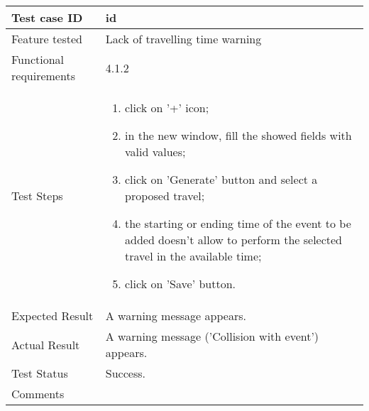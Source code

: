 \begin{table}[H]
	\begin{center}
		\begin{tabular}{ | p{} | p{} | }
		\hline
		Test case ID & id\\
		\hline
		Feature tested & Lack of travelling time warning\\
		\hline
		Functional requirements & 4.1.2 \\
    	\hline
		Test Steps & 
			\begin{enumerate}
				\item click on '+' icon;
				\item in the new window, fill the showed fields with valid values;
				\item click on 'Generate' button and select a proposed travel;
				\item the starting or ending time of the event to be added doesn't allow to perform the selected travel in the available time;
				\item click on 'Save' button.
			\end{enumerate} \\
		\hline
		Expected Result & A warning message appears.\\
		\hline
		Actual Result & A warning message ('Collision with event') appears.\\ 
		\hline
		Test Status & \color{ForestGreen}Success.\\ 
		\hline
		Comments & \\ 
		\hline
		
		\end{tabular}
	\end{center}
\end{table}

